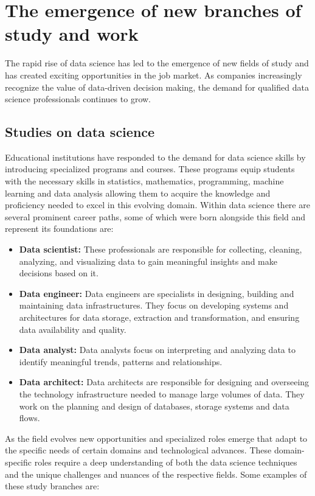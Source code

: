 \documentclass{vgtc}                          %
\begin{document}
\section{The emergence of new branches of study and work}

The rapid rise of data science has led to the emergence of new fields of study and has created exciting opportunities in the job market. As 
companies increasingly recognize the value of data-driven decision making, the demand for qualified data science professionals continues to grow.
 
\subsection{Studies on data science}

Educational institutions have responded to the demand for data science skills by introducing specialized programs and courses. These programs equip students with the necessary 
skills in statistics, mathematics, programming, machine learning and data analysis allowing them to acquire the knowledge and proficiency needed to excel in this evolving domain. 
Within data science there are several prominent career paths, some of which were born alongside this field and represent its foundations are:

\begin{itemize}
  \item \textbf{Data scientist:} These professionals are responsible for collecting, cleaning, 
  analyzing, and visualizing data to gain meaningful insights and make decisions based on it.
  \item \textbf{Data engineer:} Data engineers are specialists in designing, building and maintaining data infrastructures. They focus on developing systems and architectures for 
  data storage, extraction and transformation, and ensuring data availability and quality.
  \item \textbf{Data analyst:} Data analysts focus on interpreting and analyzing data to identify meaningful trends, patterns and relationships.
  \item \textbf{Data architect:} Data architects are responsible for designing and overseeing the technology infrastructure needed to manage large volumes of data. They work on the 
  planning and design of databases, storage systems and data flows.
\end{itemize} 

As the field evolves new opportunities and specialized roles emerge that adapt to the specific needs of certain domains and technological advances. These domain-specific roles require 
a deep understanding of both the data science techniques and the unique challenges and nuances of the respective fields. Some examples of these study branches are:
\end{document}
